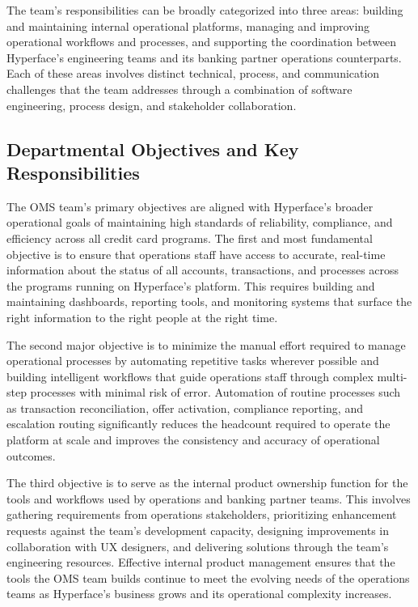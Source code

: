 The team's responsibilities can be broadly categorized into three areas: building and maintaining internal operational platforms, managing and improving operational workflows and processes, and supporting the coordination between Hyperface's engineering teams and its banking partner operations counterparts. Each of these areas involves distinct technical, process, and communication challenges that the team addresses through a combination of software engineering, process design, and stakeholder collaboration.

\subsection{Departmental Objectives and Key Responsibilities}

The OMS team's primary objectives are aligned with Hyperface's broader operational goals of maintaining high standards of reliability, compliance, and efficiency across all credit card programs. The first and most fundamental objective is to ensure that operations staff have access to accurate, real-time information about the status of all accounts, transactions, and processes across the programs running on Hyperface's platform. This requires building and maintaining dashboards, reporting tools, and monitoring systems that surface the right information to the right people at the right time.

The second major objective is to minimize the manual effort required to manage operational processes by automating repetitive tasks wherever possible and building intelligent workflows that guide operations staff through complex multi-step processes with minimal risk of error. Automation of routine processes such as transaction reconciliation, offer activation, compliance reporting, and escalation routing significantly reduces the headcount required to operate the platform at scale and improves the consistency and accuracy of operational outcomes.

The third objective is to serve as the internal product ownership function for the tools and workflows used by operations and banking partner teams. This involves gathering requirements from operations stakeholders, prioritizing enhancement requests against the team's development capacity, designing improvements in collaboration with UX designers, and delivering solutions through the team's engineering resources. Effective internal product management ensures that the tools the OMS team builds continue to meet the evolving needs of the operations teams as Hyperface's business grows and its operational complexity increases.

